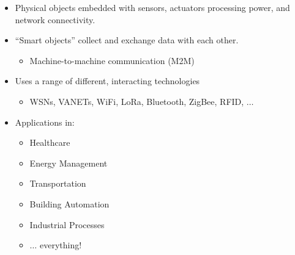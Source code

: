 \begin{itemize}[noitemsep]
\item Physical objects embedded with sensors, actuators processing power, and network connectivity.
\item “Smart objects” collect and exchange data with each other.
  \begin{itemize}[noitemsep]
  \item Machine-to-machine communication (M2M)
  \end{itemize}

\item Uses a range of different, interacting technologies
  \begin{itemize}[noitemsep]
  \item WSNs, VANETs, WiFi, LoRa, Bluetooth, ZigBee, RFID, $\ldots$
  \end{itemize}

\item Applications in:
  \begin{itemize}[noitemsep]
  \item Healthcare
  \item Energy Management
  \item Transportation
  \item Building Automation
  \item Industrial Processes
  \item $\ldots$ everything!
  \end{itemize}
\end{itemize}

